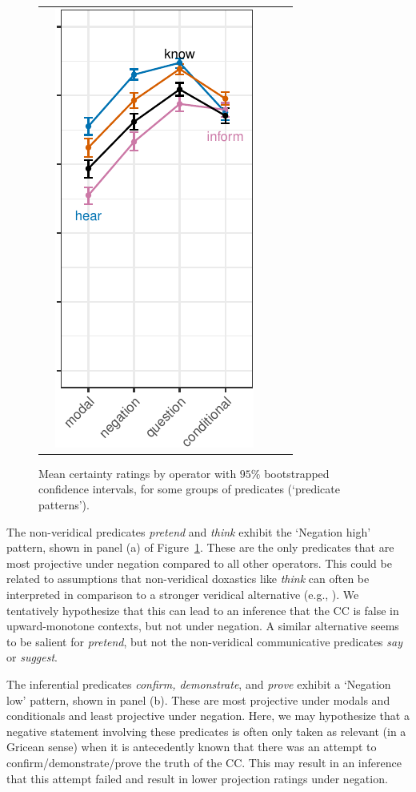 \documentclass[a4paper,12pt,twoside]{article}
\begin{document}
\begin{figure}[ht]
\begin{tabular}{p{.205\linewidth} p{.18\linewidth} p{.18\linewidth} p{.18\linewidth} p{.18\linewidth}}
			&
			\vspace{-.6\baselineskip}
			\includegraphics[width=.2\textwidth, valign=T]{modal-low-1.pdf}
			\\
		\end{tabular}
		
		\caption{Mean certainty ratings by operator with $95\%$ bootstrapped confidence intervals, for some groups of predicates (\lq predicate patterns\rq).}
		\label{fig:patterns}
	\end{figure}

	
	The non-veridical predicates \emph{pretend} and \emph{think} exhibit the `Negation high' pattern, shown in panel (a) of Figure~\ref{fig:patterns}. These are the only predicates that are most projective under negation compared to all other operators. This could be related to 
	assumptions that non-veridical doxastics like \emph{think} can often be interpreted in comparison to a stronger veridical alternative (e.g., \citealt{heim_artikel_1991,chemla_epistemic_2008}). We tentatively hypothesize that this can lead to an inference that the CC is false in upward-monotone contexts, but not under negation. A similar alternative seems to be salient for \emph{pretend}, but not the non-veridical communicative predicates \emph{say} or \emph{suggest}.
	
	The inferential predicates \emph{confirm, demonstrate}, and \emph{prove} exhibit a `Negation low' pattern, shown in panel (b). These are most projective under modals and conditionals and least projective under negation. Here, we may hypothesize that a negative statement involving these predicates is often only taken as relevant (in a Gricean sense) when it is antecedently known that there was an attempt to confirm/demonstrate/prove the truth of the CC. This may result in an inference that this attempt failed and result in lower projection ratings under negation.
	
\end{document}
